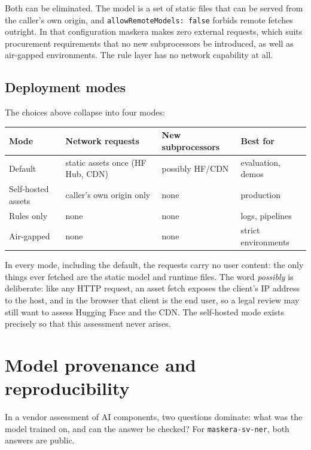 \documentclass[10pt,a4paper]{article}
\newcommand{\pkg}[1]{\texttt{#1}}
\begin{document}
Both can be eliminated. The model is a set of static files that can be served
from the caller's own origin, and \pkg{allowRemoteModels: false} forbids
remote fetches outright. In that configuration maskera makes zero external
requests, which suits procurement requirements that no new subprocessors be
introduced, as well as air-gapped environments. The rule layer has no network
capability at all.

\subsection{Deployment modes}

The choices above collapse into four modes:

\begin{table}[H]
\centering
\small
\begin{tabular}{llll}
\toprule
Mode & Network requests & New subprocessors & Best for \\
\midrule
Default & static assets once (HF Hub, CDN) & possibly HF/CDN & evaluation, demos \\
Self-hosted assets & caller's own origin only & none & production \\
Rules only & none & none & logs, pipelines \\
Air-gapped & none & none & strict environments \\
\bottomrule
\end{tabular}
\end{table}

In every mode, including the default, the requests carry no user content:
the only things ever fetched are the static model and runtime files. The
word \emph{possibly} is deliberate: like any HTTP request, an asset fetch
exposes the client's IP address to the host, and in the browser that
client is the end user, so a legal review may still want to assess Hugging
Face and the CDN. The self-hosted mode exists precisely so that this
assessment never arises.

\section{Model provenance and reproducibility}

In a vendor assessment of AI components, two questions dominate: what was the
model trained on, and can the answer be checked? For \pkg{maskera-sv-ner},
both answers are public.
\end{document}

